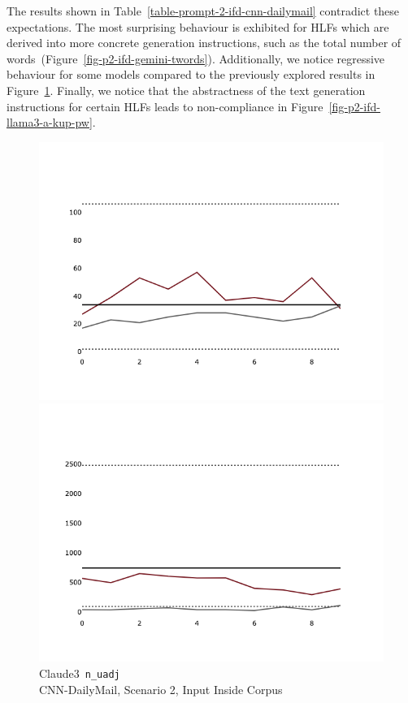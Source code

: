 \documentclass[a4paper,twoside]{article}
\begin{document}
The results shown in Table~\ref{table-prompt-2-ifd-cnn-dailymail} contradict
these expectations.
The most surprising behaviour is exhibited for HLFs which are derived into more
concrete generation instructions, such as the total number of
words~(Figure~\ref{fig-p2-ifd-gemini-twords}).
Additionally, we notice regressive behaviour for some models compared to the
previously explored results in Figure~\ref{fig-p2-ifd-claude3-nuadj}.
Finally, we notice that the abstractness of the text generation instructions for
certain HLFs leads to non-compliance in Figure~\ref{fig-p2-ifd-llama3-a-kup-pw}.

\begin{figure}[ht!]
    \centering
    \begin{minipage}{0.32\textwidth}
        \includegraphics[width=\linewidth]{plots/prompt_2_ifd/prompt_2-claude3-cnn_dailymail/prompt_2-claude3-cnn_dailymail_n_uadj.png}
        \caption{Claude3~\texttt{n\_uadj}\\CNN-DailyMail, Scenario 2, Input Inside Corpus}\label{fig-p2-ifd-claude3-nuadj}
    \end{minipage}
    \hfill
    \begin{minipage}{0.32\textwidth}
        \includegraphics[width=\linewidth]{plots/prompt_2_ifd/prompt_2-gemini-cnn_dailymail/prompt_2-gemini-cnn_dailymail_t_word.png}

\end{minipage}
\end{figure}
\end{document}
